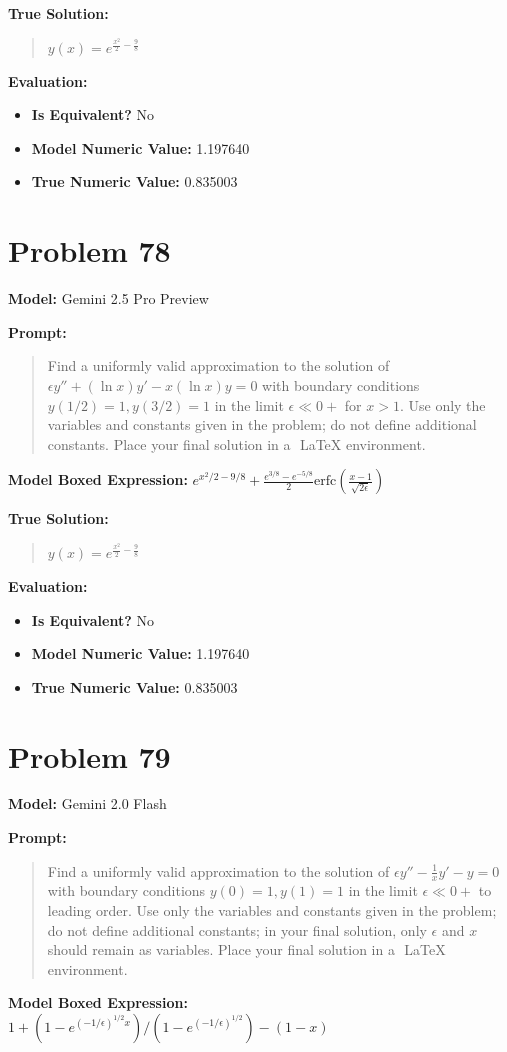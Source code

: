 \documentclass{article}
\begin{document}
{\textbf{True Solution:}
\begin{quote}
$y(x) = e^{\frac{x^2}{2} - \frac{9}{8}}$
\end{quote}

\textbf{Evaluation:}
\begin{itemize}
\item \textbf{Is Equivalent?} No
\item \textbf{Model Numeric Value:} 1.197640
\item \textbf{True Numeric Value:} 0.835003
\end{itemize}
\vspace{1cm}
\section*{Problem 78}
\textbf{Model:} Gemini 2.5 Pro Preview

\textbf{Prompt:}
\begin{quote}
Find a uniformly valid approximation to the solution of $\epsilon y'' + (\ln x) y' - x(\ln x) y = 0$ with boundary conditions $y(1/2)=1, y(3/2)=1$ in the limit $\epsilon \ll 0+$ for $x>1$. Use only the variables and constants given in the problem; do not define additional constants. Place your final solution in a $\boxed{}$ LaTeX environment.
\end{quote}
\textbf{Model Boxed Expression:} $e^{x^2/2-9/8} + \frac{e^{3/8} - e^{-5/8}}{2} \text{erfc}\left(\frac{x-1}{\sqrt{2\epsilon}}\right)$

\textbf{True Solution:}
\begin{quote}
$y(x) = e^{\frac{x^2}{2} - \frac{9}{8}}$
\end{quote}

\textbf{Evaluation:}
\begin{itemize}
\item \textbf{Is Equivalent?} No
\item \textbf{Model Numeric Value:} 1.197640
\item \textbf{True Numeric Value:} 0.835003
\end{itemize}
\vspace{1cm}
\section*{Problem 79}
\textbf{Model:} Gemini 2.0 Flash

\textbf{Prompt:}
\begin{quote}
Find a uniformly valid approximation to the solution of $\epsilon y'' - \frac{1}{x} y' - y = 0$ with boundary conditions $y(0) = 1, y(1) = 1$ in the limit $\epsilon \ll 0+$ to leading order. Use only the variables and constants given in the problem; do not define additional constants; in your final solution, only $\epsilon$ and $x$ should remain as variables. Place your final solution in a $\boxed{}$ LaTeX environment.
\end{quote}
\textbf{Model Boxed Expression:} $1 + (1-e^{(-1/\epsilon)^{1/2}x})/(1-e^{(-1/\epsilon)^{1/2}}) - (1-x)$

}
\end{document}
